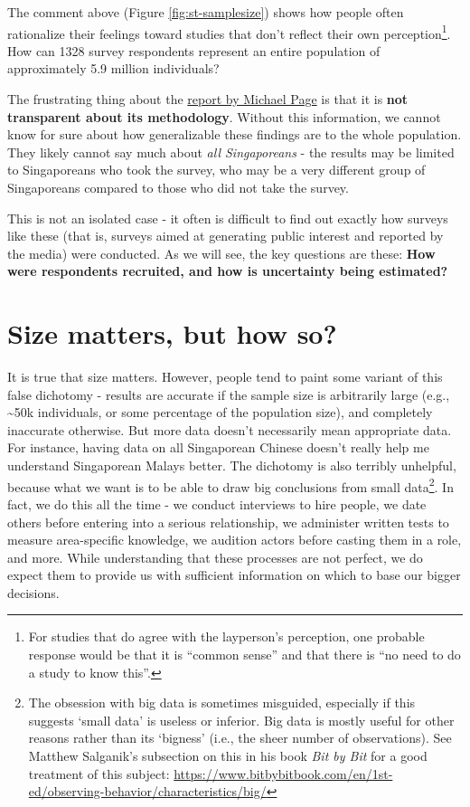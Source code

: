 \documentclass[
  openany]{book}
\begin{document}
The comment above (Figure \ref{fig:st-samplesize}) shows how people often rationalize their feelings toward studies that don't reflect their own perception\footnote{For studies that do agree with the layperson's perception, one probable response would be that it is ``common sense'' and that there is ``no need to do a study to know this''.}. How can 1328 survey respondents represent an entire population of approximately 5.9 million individuals?

The frustrating thing about the \href{https://www.michaelpage.com.sg/advice/career-advice/work-life-balance/singapore-happy-work}{report by Michael Page} is that it is \textbf{not transparent about its methodology}. Without this information, we cannot know for sure about how generalizable these findings are to the whole population. They likely cannot say much about \emph{all Singaporeans} - the results may be limited to Singaporeans who took the survey, who may be a very different group of Singaporeans compared to those who did not take the survey.

This is not an isolated case - it often is difficult to find out exactly how surveys like these (that is, surveys aimed at generating public interest and reported by the media) were conducted. As we will see, the key questions are these: \textbf{How were respondents recruited, and how is uncertainty being estimated?}

\hypertarget{size-matters-but-how-so}{%
\section{Size matters, but how so?}\label{size-matters-but-how-so}}

It is true that size matters. However, people tend to paint some variant of this false dichotomy - results are accurate if the sample size is arbitrarily large (e.g., \textasciitilde50k individuals, or some percentage of the population size), and completely inaccurate otherwise. But more data doesn't necessarily mean appropriate data. For instance, having data on all Singaporean Chinese doesn't really help me understand Singaporean Malays better. The dichotomy is also terribly unhelpful, because what we want is to be able to draw big conclusions from small data\footnote{The obsession with big data is sometimes misguided, especially if this suggests `small data' is useless or inferior. Big data is mostly useful for other reasons rather than its `bigness' (i.e., the sheer number of observations). See Matthew Salganik's subsection on this in his book \emph{Bit by Bit} for a good treatment of this subject: \url{https://www.bitbybitbook.com/en/1st-ed/observing-behavior/characteristics/big/}}. In fact, we do this all the time - we conduct interviews to hire people, we date others before entering into a serious relationship, we administer written tests to measure area-specific knowledge, we audition actors before casting them in a role, and more. While understanding that these processes are not perfect, we do expect them to provide us with sufficient information on which to base our bigger decisions.
\end{document}
